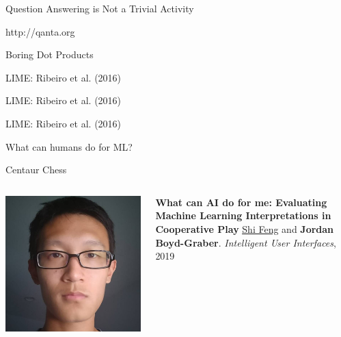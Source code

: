 \documentclass[xcolor=dvipsnames]{beamer}
\newcommand{\fsi}[2]{
\begin{frame}[plain]
\vspace*{-1pt}
\makebox[\linewidth]{\texttt{[image: \#1]}}
\begin{center}
#2
\end{center}
\end{frame}
}
\begin{document}
\fsi{qb/seattle_crowd}{Question Answering is Not a Trivial Activity}
\fsi{qb/chicago_crowd}{http://qanta.org}

\fsi{qb/boring_dot_products}{Boring Dot Products}

\fsi{general_figures/blackbox}{}

\fsi{interpretability/lime_explanation}{LIME: Ribeiro et al. (2016)}

\fsi{interpretability/lime_image_explain}{LIME: Ribeiro et al. (2016)}

\fsi{interpretability/mt_task}{LIME: Ribeiro et al. (2016)}

\fsi{interpretability/mt_results}{What can humans do for ML?}

\fsi{simtrans/centaur-chess}{Centaur Chess}


\begin{frame}{}

  \begin{columns}
    \begin{center}
        \includegraphics[width=0.8\linewidth]{general_figures/shi}
        \end{center}
        \begin{block}{{\bf What can AI do for me: Evaluating Machine Learning Interpretations in Cooperative Play}} \underline{\href{http://users.umiacs.umd.edu/~shifeng/}{Shi Feng}} and {\bf Jordan Boyd-Graber}. \emph{Intelligent User Interfaces}, 2019
        \end{block}

  \end{columns}
\end{frame}
\end{document}
